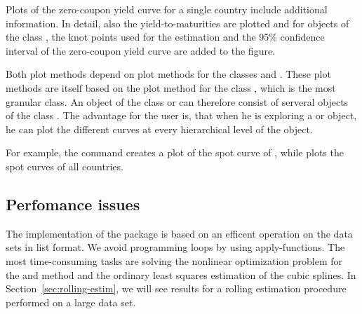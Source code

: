 Plots of the zero-coupon yield curve for a single country include additional information. In detail, 
also the yield-to-maturities are plotted and for objects of the class , the knot points used for the estimation and the 95\% confidence interval of the zero-coupon yield curve are added to the figure. 

Both plot methods depend on plot methods for the classes  and . These plot methods are itself based on the plot method for the class , which is the most granular class. An object of the class  or  can therefore consist of serveral 
objects of the class . The advantage for the user is, that when he
is exploring a  or  object, he can plot the different curves at every hierarchical level of the object.

For example, the command  creates a plot of the spot curve of , while  plots the spot curves of all countries. 


\subsection{Perfomance issues}
\label{sec:perfomance-issues}

The implementation of the  package is based on an efficent operation on the data sets in list format. We avoid programming loops by using apply-functions. The most time-consuming tasks are solving the nonlinear optimization problem for the \cite{Nelson1987} and \cite{Svensson1994} method and the ordinary least squares estimation of the \cite{McCulloch1975} cubic splines. In Section~\ref{sec:rolling-estim}, we will see results for a rolling estimation procedure performed on a large data set.


